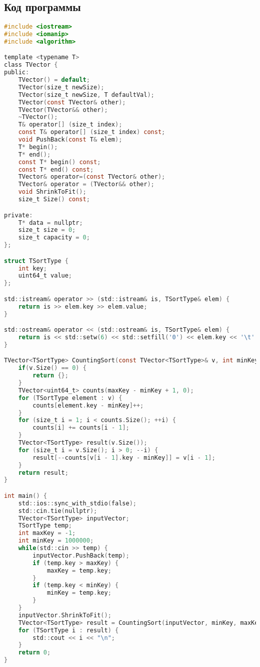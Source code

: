 \subsection{Код программы}
\begin{lstlisting}[language=C]
#include <iostream>
#include <iomanip>
#include <algorithm>

template <typename T>
class TVector {
public:
    TVector() = default;
    TVector(size_t newSize);
    TVector(size_t newSize, T defaultVal);
    TVector(const TVector& other);
    TVector(TVector&& other);
    ~TVector();
    T& operator[] (size_t index);
    const T& operator[] (size_t index) const;
    void PushBack(const T& elem);
    T* begin();
    T* end();
    const T* begin() const;
    const T* end() const;
    TVector& operator=(const TVector& other);
    TVector& operator = (TVector&& other);
    void ShrinkToFit();
    size_t Size() const;

private:
    T* data = nullptr;
    size_t size = 0;
    size_t capacity = 0;
};

struct TSortType {
    int key;
    uint64_t value;
};

std::istream& operator >> (std::istream& is, TSortType& elem) {
    return is >> elem.key >> elem.value;
}

std::ostream& operator << (std::ostream& is, TSortType& elem) {
    return is << std::setw(6) << std::setfill('0') << elem.key << '\t' << elem.value;
}

TVector<TSortType> CountingSort(const TVector<TSortType>& v, int minKey, int maxKey) {
    if(v.Size() == 0) {
        return {};
    }
    TVector<uint64_t> counts(maxKey - minKey + 1, 0);
    for (TSortType element : v) {
        counts[element.key - minKey]++;
    }
    for (size_t i = 1; i < counts.Size(); ++i) {
        counts[i] += counts[i - 1];
    }
    TVector<TSortType> result(v.Size());
    for (size_t i = v.Size(); i > 0; --i) {
        result[--counts[v[i - 1].key - minKey]] = v[i - 1];
    }
    return result;
}

int main() {
    std::ios::sync_with_stdio(false);
    std::cin.tie(nullptr);
    TVector<TSortType> inputVector;
    TSortType temp;
    int maxKey = -1;
    int minKey = 1000000;
    while(std::cin >> temp) {
        inputVector.PushBack(temp);
        if (temp.key > maxKey) {
            maxKey = temp.key;
        }
        if (temp.key < minKey) {
            minKey = temp.key;
        }
    }
    inputVector.ShrinkToFit();
    TVector<TSortType> result = CountingSort(inputVector, minKey, maxKey);
    for (TSortType i : result) {
        std::cout << i << "\n";
    }
    return 0;
}	
\end{lstlisting}

